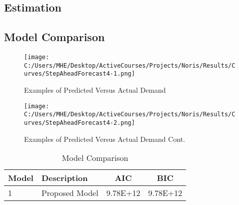 \documentclass[mksc,nonblindrev]{informs3}
\begin{document}
\subsection{Estimation}



\subsection{Model Comparison}

\begin{figure}
	\centering
		\texttt{[image: C:/Users/MHE/Desktop/ActiveCourses/Projects/Noris/Results/Curves/StepAheadForecast4-1.png]}
	\caption{Examples of Predicted Versus Actual Demand}
	\label{fig:BasicStat1}
\end{figure}

\begin{figure}
	\centering
		\texttt{[image: C:/Users/MHE/Desktop/ActiveCourses/Projects/Noris/Results/Curves/StepAheadForecast4-2.png]}
	\caption{Examples of Predicted Versus Actual Demand Cont.}
	\label{fig:BasicStat1}
\end{figure}


\begin{table}
	\centering
		\begin{tabular}{llcc}\hline \hline
			Model	&	Description	&	AIC	&	BIC	\\ \hline
1	&	Proposed Model	&	9.78E+12	&	9.78E+12	\\ \hline
		\end{tabular}
	\caption{Model Comparison}
	\label{tab:ModelComparison}
\end{table}
\end{document}
